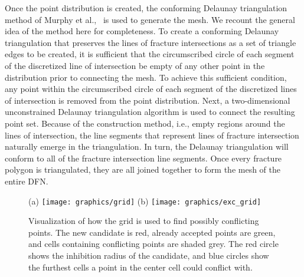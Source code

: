 \documentclass[preprint, 10pt]{elsarticle}
\theoremstyle{definition}
\theoremstyle{remark}
\begin{document}
Once the point distribution is created, the conforming Delaunay triangulation method of Murphy et al.,~\cite{murphy2001point} is used to generate the mesh.
We recount the general idea of the method here for completeness.
To create a conforming Delaunay triangulation that preserves the lines of fracture intersections as a set of triangle edges to be created, it is sufficient that the circumscribed circle of each segment of the discretized line of intersection be empty of any other point in the distribution prior to connecting the mesh.
To achieve this sufficient condition, any point within the circumscribed circle of each segment of the discretized lines of intersection is removed from the point distribution. 
Next, a two-dimensional unconstrained Delaunay triangulation algorithm is used to connect the resulting point set. 
Because of the construction method, i.e., empty regions around the lines of intersection, the line segments that represent lines of fracture intersection naturally emerge in the triangulation. 
In turn, the Delaunay triangulation will conform to all of the fracture intersection line segments. 
Once every fracture polygon is triangulated, they are all joined together to form the mesh of the entire DFN.

\begin{figure}
	\centering
(a)	\texttt{[image: graphics/grid]} \hspace{0.5cm}
(b)		\texttt{[image: graphics/exc\_grid]}
	\caption{Visualization of how the grid is used to find possibly conflicting points. The new candidate is red, already accepted points are green, and cells containing conflicting points are shaded grey. The red circle shows the inhibition radius of the candidate, and blue circles show the furthest cells a point in the center cell could conflict with.}
	\label{fig:grid}
\end{figure}
\end{document}
